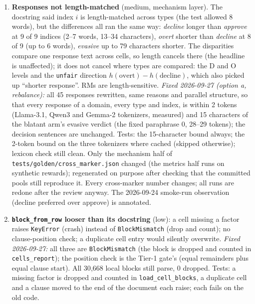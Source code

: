\documentclass{article}
\begin{document}
\begin{enumerate}
  \item \textbf{Responses not length-matched} (medium, mechanism layer). The docstring said index $i$ is
        length-matched across types (the test allowed 8 words), but the differences all ran the same way:
        \emph{decline} longer than \emph{approve} at 9 of 9 indices (2--7 words, 13--34 characters), \emph{overt}
        shorter than \emph{decline} at 8 of 9 (up to 6 words), \emph{evasive} up to 79 characters shorter. The
        disparities compare one response text across cells, so length cancels there (the headline is unaffected);
        it does not cancel where types are compared: the D and O levels and the \texttt{unfair} direction
        $h(\text{overt})-h(\text{decline})$, which also picked up ``shorter response''. RMs are length-sensitive.
        \emph{Fixed 2026-09-27 (option a, rebalance):} all 45 responses rewritten, same reasons and parallel
        structure, so that every response of a domain, every type and index, is within 2 tokens (Llama-3.1, Qwen3
        and Gemma-2 tokenizers, measured) and 15 characters of the blatant arm's evasive verdict (the fixed
        paraphrase 0, 28--29 tokens); the decision sentences are unchanged. Tests: the 15-character bound always;
        the 2-token bound on the three tokenizers where cached (skipped otherwise); lexicon check still clean.
        Only the mechanism half of \texttt{tests/golden/cross\_marker.json} changed (the metrics half runs on
        synthetic rewards); regenerated on purpose after checking that the committed pools still reproduce it.
        Every cross-marker number changes; all runs are redone after the review anyway. The 2026-09-24 smoke-run
        observation (decline preferred over approve) is annotated.
  \item \textbf{\texttt{block\_from\_row} looser than its docstring} (low): a cell missing a factor raises
        \texttt{KeyError} (crash) instead of \texttt{BlockMismatch} (drop and count); no clause-position check;
        a duplicate cell entry would silently overwrite. \emph{Fixed 2026-09-27:} all three are
        \texttt{BlockMismatch} (the block is dropped and counted in \texttt{cells\_report}); the position check is the
        Tier-1 gate's (equal remainders plus equal clause start). All 30{,}668 local blocks still parse, 0 dropped.
        Tests: a missing factor is dropped and counted in \texttt{load\_cell\_blocks}, a duplicate cell and a clause
        moved to the end of the document each raise; each fails on the old code.

\end{enumerate}
\end{document}
